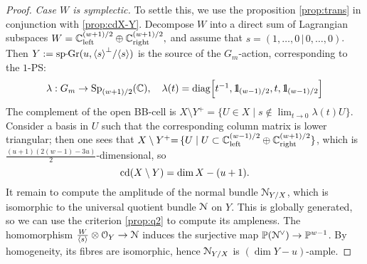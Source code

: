 \documentclass[11pt,reqno]{amsart}
\let\euf\EuScript
\let\mbb\mathbb
\let\nit\noindent
\let\lan\langle
\let\ran\rangle
\numberwithin{equation}{section}
\numberwithin{figure}{section}
\let\l\lambda
\let\sm\setminus
\begin{document}
\begin{proof}
\nit\textit{Case $W$ is symplectic.}\quad 
To settle this, we use the proposition \ref{prop:trans} in conjunction with 
\ref{prop:cdX-Y}. Decompose $W$ into a direct sum of Lagrangian subspaces  
$W={{\mbb C}}^{(w+1)/2}_{\rm left}\oplus{{\mbb C}}^{(w+1)/2}_{\rm right},$ 
and assume that $s=(1,\ldots,0\,|\,0,\ldots,0)$. 
Then $Y:={{\rm sp{{{\vrule height2.75pt depth-2.35pt width2.3pt \kern1.7pt}}\!}Gr}}(u,{{\lan {s}\ran}}^\perp/{{\lan {s}\ran}})$ is the source of the $G_m$-action, 
corresponding to the $1$-PS: 
\begin{equation}\label{eq:l1}
\begin{array}{r}
\l:G_m\to{{\rm Sp}}_{(w+1)/2}({{\mbb C}}),\quad
\l(t)={\mathop{\rm diag}\nolimits}\Big[t^{-1},{{1\kern-0.57ex\rm l}}_{(w-1)/2},t,{{1\kern-0.57ex\rm l}}_{(w-1)/2}\Big]
\end{array}
\end{equation}
The complement of the open BB-cell is 
$X\sm Y^+=\big\{U\in X\mid s\not\in\lim_{t\to 0}\l(t)U\big\}.$ 
Consider a basis in $U$ such that the corresponding column matrix is lower triangular; 
then one sees that 
$X\sm Y^+{=}
\,\{U\mid U\subset{{\mbb C}}^{(w-1)/2}_{\rm left}\oplus{{\mbb C}}^{(w+1)/2}_{\rm right}\}$, 
which is $\frac{(u+1)(2(w-1)-3u)}{2}$-dimensional, so 
$$
{{\rm cd}}(X\sm Y)=\dim X-(u+1).
$$ 
It remain to compute the amplitude of the normal bundle ${{\euf N}}_{Y/X}$, which is 
isomorphic to the universal quotient bundle ${{\euf N}}$ on $Y$. This is globally generated, 
so we can use the criterion \ref{prop:q2} to compute its ampleness. 
The homomorphism $\frac{W}{{{\lan {s}\ran}}}\otimes{{\euf O}}_Y\to{{\euf N}}$ induces 
the surjective map $\mbb P({{\euf N}}^\vee)\to\mbb P^{w-1}$. By homogeneity, 
its fibres are isomorphic, hence ${{\euf N}}_{Y/X}$ is $(\dim Y-u)$-ample. 
 

\end{proof}
\end{document}
